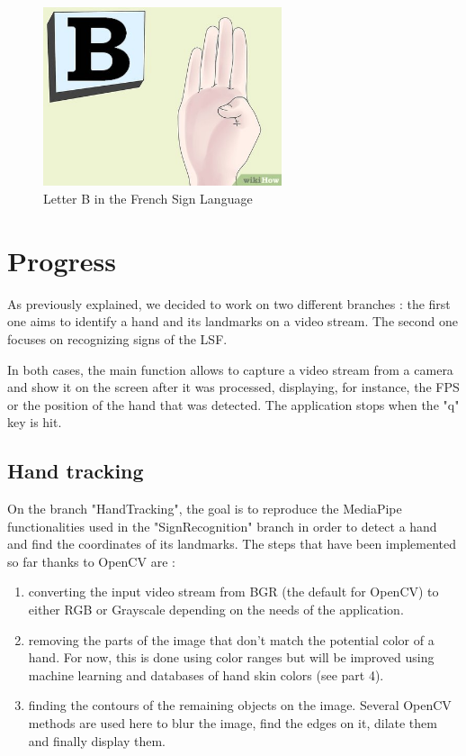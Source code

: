 \documentclass{article}
\begin{document}
	\begin{figure}[h!]
		\center
		\includegraphics[width=70mm]{lettre-B.jpg}
		\caption{Letter B in the French Sign Language}
	\end{figure}



	\newpage\section{ Progress }\label{sec:second}
	As previously explained, we decided to work on two different branches : the first one aims to identify a hand and its landmarks on a video stream. The second one focuses on recognizing signs of the LSF.

In both cases, the main function allows to capture a video stream from a camera and show it on the screen after it was processed, displaying, for instance, the FPS or the position of the hand that was detected. The application stops when the "q" key is hit.

	\subsection{Hand tracking}\label{sec:first}
On the branch "HandTracking", the goal is to reproduce the MediaPipe functionalities used in the "SignRecognition" branch in order to detect a hand and find the coordinates of its landmarks. The steps that have been implemented so far thanks to OpenCV are :
\begin{enumerate}
  \item converting the input video stream from BGR (the default for OpenCV) to either RGB or Grayscale depending on the needs of the application.
  \item removing the parts of the image that don't match the potential color of a hand. For now, this is done using color ranges but will be improved using machine learning and databases of hand skin colors (see part 4).
  \item finding the contours of the remaining objects on the image. Several OpenCV methods are used here to blur the image, find the edges on it, dilate them and finally display them.
\end{enumerate}
\end{document}
